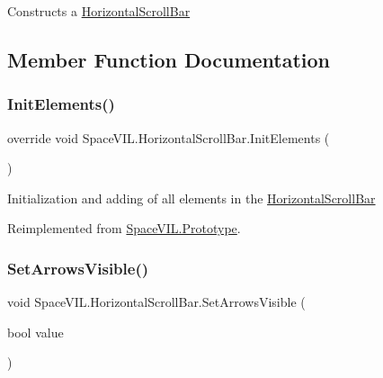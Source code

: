 Constructs a \mbox{\hyperlink{class_space_v_i_l_1_1_horizontal_scroll_bar}{Horizontal\+Scroll\+Bar}} 



\subsection{Member Function Documentation}
\mbox{\label{class_space_v_i_l_1_1_horizontal_scroll_bar_a28b7659ed7580fee8b4bf4fb951f1daa}} 
\subsubsection{\texorpdfstring{Init\+Elements()}{InitElements()}}
{\footnotesize\ttfamily override void Space\+V\+I\+L.\+Horizontal\+Scroll\+Bar.\+Init\+Elements (\begin{DoxyParamCaption}{ }\end{DoxyParamCaption})\hspace{0.3cm}{\ttfamily [virtual]}}



Initialization and adding of all elements in the \mbox{\hyperlink{class_space_v_i_l_1_1_horizontal_scroll_bar}{Horizontal\+Scroll\+Bar}} 



Reimplemented from \mbox{\hyperlink{class_space_v_i_l_1_1_prototype_ac3379fe02923ee155b5b0084abf27420}{Space\+V\+I\+L.\+Prototype}}.

\mbox{\label{class_space_v_i_l_1_1_horizontal_scroll_bar_a5fb41915b15f89e13da665dab8fa3b31}} 
\subsubsection{\texorpdfstring{Set\+Arrows\+Visible()}{SetArrowsVisible()}}
{\footnotesize\ttfamily void Space\+V\+I\+L.\+Horizontal\+Scroll\+Bar.\+Set\+Arrows\+Visible (\begin{DoxyParamCaption}\item[{bool}]{value }\end{DoxyParamCaption})}



